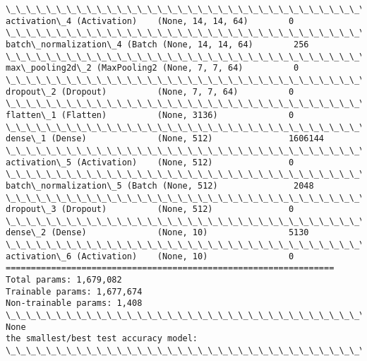 \documentclass[11pt]{article}
\begin{document}
\begin{Verbatim}[commandchars=\\\{\}]
\_\_\_\_\_\_\_\_\_\_\_\_\_\_\_\_\_\_\_\_\_\_\_\_\_\_\_\_\_\_\_\_\_\_\_\_\_\_\_\_\_\_\_\_\_\_\_\_\_\_\_\_\_\_\_\_\_\_\_\_\_\_\_\_\_
activation\_4 (Activation)    (None, 14, 14, 64)        0         
\_\_\_\_\_\_\_\_\_\_\_\_\_\_\_\_\_\_\_\_\_\_\_\_\_\_\_\_\_\_\_\_\_\_\_\_\_\_\_\_\_\_\_\_\_\_\_\_\_\_\_\_\_\_\_\_\_\_\_\_\_\_\_\_\_
batch\_normalization\_4 (Batch (None, 14, 14, 64)        256       
\_\_\_\_\_\_\_\_\_\_\_\_\_\_\_\_\_\_\_\_\_\_\_\_\_\_\_\_\_\_\_\_\_\_\_\_\_\_\_\_\_\_\_\_\_\_\_\_\_\_\_\_\_\_\_\_\_\_\_\_\_\_\_\_\_
max\_pooling2d\_2 (MaxPooling2 (None, 7, 7, 64)          0         
\_\_\_\_\_\_\_\_\_\_\_\_\_\_\_\_\_\_\_\_\_\_\_\_\_\_\_\_\_\_\_\_\_\_\_\_\_\_\_\_\_\_\_\_\_\_\_\_\_\_\_\_\_\_\_\_\_\_\_\_\_\_\_\_\_
dropout\_2 (Dropout)          (None, 7, 7, 64)          0         
\_\_\_\_\_\_\_\_\_\_\_\_\_\_\_\_\_\_\_\_\_\_\_\_\_\_\_\_\_\_\_\_\_\_\_\_\_\_\_\_\_\_\_\_\_\_\_\_\_\_\_\_\_\_\_\_\_\_\_\_\_\_\_\_\_
flatten\_1 (Flatten)          (None, 3136)              0         
\_\_\_\_\_\_\_\_\_\_\_\_\_\_\_\_\_\_\_\_\_\_\_\_\_\_\_\_\_\_\_\_\_\_\_\_\_\_\_\_\_\_\_\_\_\_\_\_\_\_\_\_\_\_\_\_\_\_\_\_\_\_\_\_\_
dense\_1 (Dense)              (None, 512)               1606144   
\_\_\_\_\_\_\_\_\_\_\_\_\_\_\_\_\_\_\_\_\_\_\_\_\_\_\_\_\_\_\_\_\_\_\_\_\_\_\_\_\_\_\_\_\_\_\_\_\_\_\_\_\_\_\_\_\_\_\_\_\_\_\_\_\_
activation\_5 (Activation)    (None, 512)               0         
\_\_\_\_\_\_\_\_\_\_\_\_\_\_\_\_\_\_\_\_\_\_\_\_\_\_\_\_\_\_\_\_\_\_\_\_\_\_\_\_\_\_\_\_\_\_\_\_\_\_\_\_\_\_\_\_\_\_\_\_\_\_\_\_\_
batch\_normalization\_5 (Batch (None, 512)               2048      
\_\_\_\_\_\_\_\_\_\_\_\_\_\_\_\_\_\_\_\_\_\_\_\_\_\_\_\_\_\_\_\_\_\_\_\_\_\_\_\_\_\_\_\_\_\_\_\_\_\_\_\_\_\_\_\_\_\_\_\_\_\_\_\_\_
dropout\_3 (Dropout)          (None, 512)               0         
\_\_\_\_\_\_\_\_\_\_\_\_\_\_\_\_\_\_\_\_\_\_\_\_\_\_\_\_\_\_\_\_\_\_\_\_\_\_\_\_\_\_\_\_\_\_\_\_\_\_\_\_\_\_\_\_\_\_\_\_\_\_\_\_\_
dense\_2 (Dense)              (None, 10)                5130      
\_\_\_\_\_\_\_\_\_\_\_\_\_\_\_\_\_\_\_\_\_\_\_\_\_\_\_\_\_\_\_\_\_\_\_\_\_\_\_\_\_\_\_\_\_\_\_\_\_\_\_\_\_\_\_\_\_\_\_\_\_\_\_\_\_
activation\_6 (Activation)    (None, 10)                0         
=================================================================
Total params: 1,679,082
Trainable params: 1,677,674
Non-trainable params: 1,408
\_\_\_\_\_\_\_\_\_\_\_\_\_\_\_\_\_\_\_\_\_\_\_\_\_\_\_\_\_\_\_\_\_\_\_\_\_\_\_\_\_\_\_\_\_\_\_\_\_\_\_\_\_\_\_\_\_\_\_\_\_\_\_\_\_
None
the smallest/best test accuracy model:
\_\_\_\_\_\_\_\_\_\_\_\_\_\_\_\_\_\_\_\_\_\_\_\_\_\_\_\_\_\_\_\_\_\_\_\_\_\_\_\_\_\_\_\_\_\_\_\_\_\_\_\_\_\_\_\_\_\_\_\_\_\_\_\_\_

\end{Verbatim}
\end{document}
